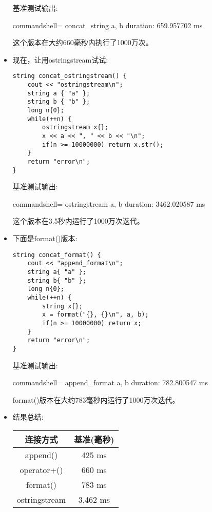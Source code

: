 \begin{itemize}
基准测试输出:

\begin{tcblisting}{commandshell={}}
concat_string
a, b
duration: 659.957702 ms
\end{tcblisting}

这个版本在大约660毫秒内执行了1000万次。

\item 
现在，让用ostringstream试试:

\begin{lstlisting}[style=styleCXX]
string concat_ostringstream() {
	cout << "ostringstream\n";
	string a { "a" };
	string b { "b" };
	long n{0};
	while(++n) {
		ostringstream x{};
		x << a << ", " << b << "\n";
		if(n >= 10000000) return x.str();
	}
	return "error\n";
}
\end{lstlisting}

基准测试输出:

\begin{tcblisting}{commandshell={}}
ostringstream
a, b
duration: 3462.020587 ms
\end{tcblisting}

这个版本在3.5秒内运行了1000万次迭代。

\item 
下面是format()版本:

\begin{lstlisting}[style=styleCXX]
string concat_format() {
	cout << "append_format\n";
	string a{ "a" };
	string b{ "b" };
	long n{0};
	while(++n) {
		string x{};
		x = format("{}, {}\n", a, b);
		if(n >= 10000000) return x;
	}
	return "error\n";
}
\end{lstlisting}

基准测试输出:

\begin{tcblisting}{commandshell={}}
append_format
a, b
duration: 782.800547 ms
\end{tcblisting}

format()版本在大约783毫秒内运行了1000万次迭代。

\item 
结果总结:

\begin{table}[H]
\centering
\begin{tabular}{|c|c|}
	\hline
	\rowcolor[HTML]{9B9B9B} 
	{\color[HTML]{FFFFFF} 连接方式} & {\color[HTML]{FFFFFF} 基准(毫秒)} \\ \hline
	append()      & 425 ms   \\ \hline
	operator+()   & 660 ms   \\ \hline
	format()      & 783 ms   \\ \hline
	ostringstream & 3,462 ms \\ \hline
\end{tabular}


\end{table}
\end{itemize}
